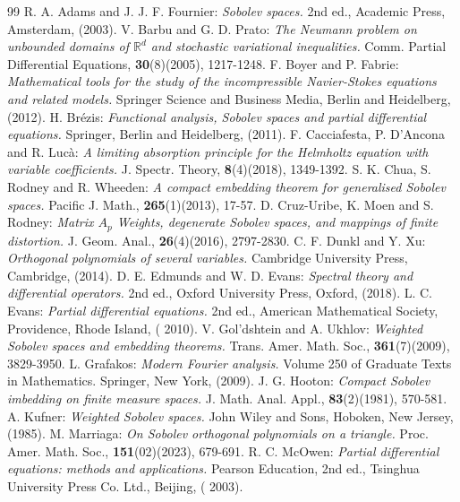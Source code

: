 \documentclass[11pt]{article}
\begin{document}
	\begin{thebibliography}{99}
 R. A. Adams {\rm and} J. J. F. Fournier:  \textit{Sobolev spaces.} 2nd ed., Academic Press, Amsterdam, (2003).
	 V. Barbu  {\rm and}  G. D. Prato: \textit{The Neumann problem on unbounded domains of $\mathbb{R}^d$ and stochastic variational inequalities.}{ Comm. Partial Differential Equations,}  {\bf 30}(8)(2005), 1217-1248.
	 F. Boyer  {\rm and}  P. Fabrie: \textit{Mathematical tools for the study of the incompressible Navier-Stokes equations and related models.} Springer Science and  Business Media, Berlin and Heidelberg, (2012).	
	  H. Br\'ezis: \textit{Functional analysis, Sobolev spaces and partial differential equations.} Springer, Berlin and Heidelberg, (2011).
	 F. Cacciafesta, P. D'Ancona  {\rm and} R. Lucà: \textit{A limiting absorption principle for the Helmholtz equation with variable coefficients.}  {J. Spectr. Theory,} {\bf 8}(4)(2018), 1349-1392.
	 S. K. Chua, S. Rodney  {\rm and} R. Wheeden: \textit{ A compact embedding theorem for generalised Sobolev spaces.} {Pacific J. Math.,} {\bf 265}(1)(2013), 17-57.
	 D. Cruz-Uribe, K. Moen  {\rm and}  S. Rodney: \textit{Matrix $A_p$ Weights, degenerate Sobolev spaces, and mappings of finite distortion.} {J. Geom. Anal.,}  {\bf 26}(4)(2016), 2797-2830.
	 C. F. Dunkl  {\rm and} Y. Xu: \textit{Orthogonal polynomials of several variables.} Cambridge University Press, Cambridge, (2014).
	 D. E.  Edmunds {\rm and } W. D. Evans:  \textit{Spectral theory and differential operators.} 2nd ed., Oxford University Press, Oxford, (2018).
	 L. C. Evans: \textit{ Partial differential equations.} 2nd ed., American Mathematical Society, Providence, Rhode Island, ( 2010).
	 V. Gol'dshtein  {\rm and}   A. Ukhlov:\textit{ Weighted Sobolev spaces and embedding theorems.} {Trans. Amer. Math. Soc.,}  {\bf 361}(7)(2009), 3829-3950.
	 L. Grafakos: \textit{Modern Fourier analysis.} Volume 250 of Graduate Texts in Mathematics. Springer,
	New York, (2009).
     J. G. Hooton:  \textit{Compact Sobolev imbedding on finite measure spaces.} J. Math. Anal. Appl., {\bf 83}(2)(1981), 570-581.
     A. Kufner: \textit{Weighted Sobolev spaces.} John Wiley and Sons, Hoboken, New Jersey, (1985).
    M. Marriaga: \textit{On Sobolev orthogonal polynomials on a triangle.} Proc. Amer. Math. Soc., {\bf 151}(02)(2023), 679-691.
	 R. C. McOwen: \textit{Partial differential equations: methods and applications.} Pearson Education, 2nd ed., Tsinghua University Press Co. Ltd., Beijing, ( 2003).

\end{thebibliography}
\end{document}
